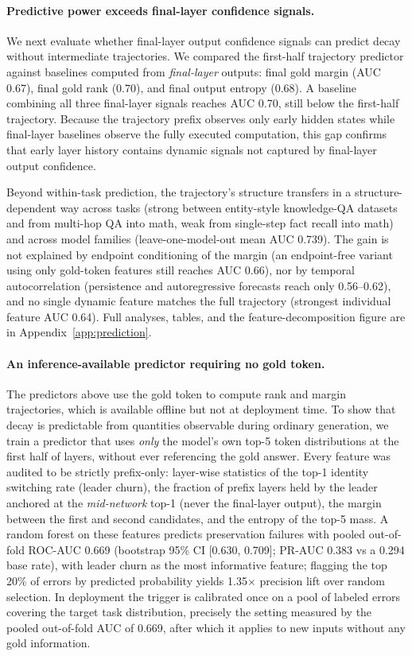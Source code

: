 \documentclass{article} %
\begin{document}
\paragraph{Predictive power exceeds final-layer confidence signals.}
We next evaluate whether final-layer output confidence signals can predict decay without intermediate trajectories. We compared the first-half trajectory predictor against baselines computed from \emph{final-layer} outputs: final gold margin (AUC 0.67), final gold rank (0.70), and final output entropy (0.68). A baseline combining all three final-layer signals reaches AUC 0.70, still below the first-half trajectory. Because the trajectory prefix observes only early hidden states while final-layer baselines observe the fully executed computation, this gap confirms that early layer history contains dynamic signals not captured by final-layer output confidence.

Beyond within-task prediction, the trajectory's structure transfers in a structure-dependent way across tasks (strong between entity-style knowledge-QA datasets and from multi-hop QA into math, weak from single-step fact recall into math) and across model families (leave-one-model-out mean AUC 0.739). The gain is not explained by endpoint conditioning of the margin (an endpoint-free variant using only gold-token features still reaches AUC 0.66), nor by temporal autocorrelation (persistence and autoregressive forecasts reach only 0.56--0.62), and no single dynamic feature matches the full trajectory (strongest individual feature AUC 0.64). Full analyses, tables, and the feature-decomposition figure are in Appendix~\ref{app:prediction}.

\paragraph{An inference-available predictor requiring no gold token.}
\label{sec:nonoracle}
The predictors above use the gold token to compute rank and margin trajectories, which is available offline but not at deployment time. To show that decay is predictable from quantities observable during ordinary generation, we train a predictor that uses \emph{only} the model's own top-5 token distributions at the first half of layers, without ever referencing the gold answer. Every feature was audited to be strictly prefix-only: layer-wise statistics of the top-1 identity switching rate (leader churn), the fraction of prefix layers held by the leader anchored at the \emph{mid-network} top-1 (never the final-layer output), the margin between the first and second candidates, and the entropy of the top-5 mass. A random forest on these features predicts preservation failures with pooled out-of-fold ROC-AUC 0.669 (bootstrap 95\% CI [0.630, 0.709]; PR-AUC 0.383 vs a 0.294 base rate), with leader churn as the most informative feature; flagging the top 20\% of errors by predicted probability yields 1.35$\times$ precision lift over random selection. In deployment the trigger is calibrated once on a pool of labeled errors covering the target task distribution, precisely the setting measured by the pooled out-of-fold AUC of 0.669, after which it applies to new inputs without any gold information.
\end{document}
